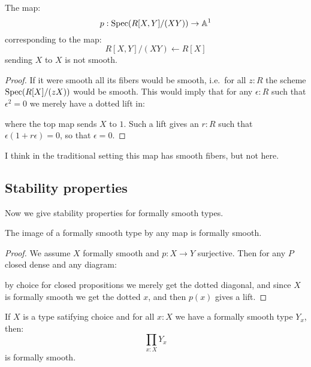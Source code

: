 \begin{lemma}
The map:
\[
p:\operatorname{Spec}(R[X,Y]/(XY))\to \mathbb{A}^1
\] 
corresponding to the map:
\[
R[X,Y]/(XY) \leftarrow R[X]
\]
sending $X$ to $X$ is not smooth.
\end{lemma}

\begin{proof}
If it were smooth all its fibers would be smooth,
i.e.\ for all $z:R$ the scheme $\operatorname{Spec}(R[X]/(zX))$ would be smooth.
This would imply that for any $\epsilon:R$ such that $\epsilon^2=0$ we merely have a dotted lift in:
 \begin{center}
    \end{center} 
    where the top map sends $X$ to $1$.
    Such a lift gives an $r:R$ such that $\epsilon(1+r\epsilon)=0$, so that $\epsilon=0$.
\end{proof}

I think in the traditional setting this map has smooth fibers, but not here. 

\subsection{Stability properties}

Now we give stability properties for formally smooth types.

\begin{proposition}
\label{smoothSurjective}
The image of a formally smooth type by any map is formally smooth.
\end{proposition}
\begin{proof}
We assume $X$ formally smooth and $p:X\to Y$ surjective. Then for any $P$ closed dense and any diagram:
 \begin{center}
    \end{center} 
    by choice for closed propositions we merely get the dotted diagonal, and since $X$ is formally smooth we get the dotted $x$, and then $p(x)$ gives a lift.
\end{proof}

\begin{lemma}
If $X$ is a type satifying choice and for all $x:X$ we have a formally smooth type $Y_x$, then:
\[\prod_{x:X}Y_x\]
is formally smooth.
\end{lemma}

